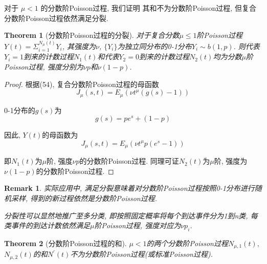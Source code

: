 \documentclass[a4paper, 12pt]{ctexart}
\newtheorem{theorem}{Theorem}[section]
\newtheorem*{remark}{Remark}
\begin{document}
对于 $\mu <1$ 的分数阶Poisson过程,   我们证明
其和不为分数阶Poisson过程,   但复合分数阶Poisson过程依然满足分裂. 
\begin{theorem}[分数阶Poisson过程的分裂]
对于复合分数$\mu \leq 1$阶Poisson过程$Y(t)=\Sigma _{i=1} ^{N_{\mu}(t)}Y_i$,   其强度为$\nu$,   $\{Y_i\}$为独立同分布的0-1分布$Y_i\sim b(1,   p)$. 则代表$Y_i=1$到来的计数过程$N_{1}(t)$和代表$Y_2=0$到来的计数过程$N_{2}(t)$均为分数$\mu$阶Poisson过程,   强度分别为$\nu p$和$\nu (1-p)$. 
\end{theorem}
\begin{proof}
根据\cite{1}(54),   复合分数阶Poisson过程的母函数
\begin{equation}
J_{\mu}(s,   t)=E_{\mu}\left(\nu t^{\mu}(g(s)-1)\right)
\end{equation}

0-1分布的$g(s)$为
\begin{equation}
g(s)=pe^s+(1-p)
\end{equation}

因此,   $Y(t)$的母函数为
\begin{equation}
J_{\mu}(s,   t)=E_{\mu}\left(\nu t^{\mu}p(e^s-1)\right)
\end{equation}

即$N_{1}(t)$为$\mu$阶,   强度$\nu p$的分数阶Poisson过程. 同理可证$N_{2}(t)$为$\mu$阶,   强度为$\nu (1-p)$的分数阶Poisson过程. 
\end{proof}
\begin{remark}
实际应用中, 满足分裂意味着对分数阶Poisson过程按照0-1分布进行随机采样, 得到的新过程依然是分数阶Poisson过程.

分裂性可以显然地推广至多分类, 即按照固定概率将每个到达事件分为1到n类, 每类事件的到达计数依然满足$\mu$阶Poisson过程, 强度对应为$\nu p_i$.
\end{remark}
\begin{theorem}[分数阶Poisson过程的和]
$\mu <1$的两个分数阶Poisson过程$N_{\mu ,   1}(t),   $$N_{\mu ,   2}(t)$的和$N^{\prime}(t)$不为分数阶Poisson过程(或标准Poisson过程). 
\end{theorem}
\end{document}
